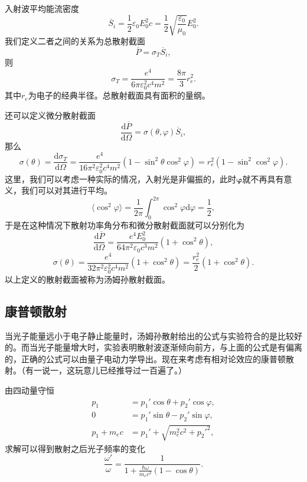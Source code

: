 \documentclass[UTF8]{ctexbook}
\renewcommand{\d}{\mathrm{d}}
\renewcommand{\b}{\boldsymbol}
\numberwithin{equation}{chapter}
\begin{document}
	入射波平均能流密度
	\[\overline{S}_i=\frac{1}{2}\varepsilon_0 E_0^2 c=\frac{1}{2}\sqrt{\frac{\varepsilon_0}{\mu_0}}E_0^2.\]
	我们定义二者之间的关系为总散射截面
	\[\overline{P}=\sigma_T\overline{S}_i,\]
	则
	\[\sigma_T=\frac{e^4}{6\pi\varepsilon_0^2 c^4 m^2}=\frac{8\pi}{3}r_e^2.\]
	其中$r_e$为电子的经典半径。总散射截面具有面积的量纲。
	
	还可以定义微分散射截面
	\[\frac{\d \overline{P}}{\d \Omega}=\sigma(\theta,\varphi)\overline{S}_i,\]
	那么
	\[\sigma(\theta)=\frac{\d \sigma_T}{\d\Omega}=\frac{e^4}{16\pi^2\varepsilon_0^2c^4m^2}(1-\sin^2\theta\cos^2\varphi)=r_e^2(1-\sin^2\cos^2\varphi).\]
	这里，我们可以考虑一种实际的情况，入射光是非偏振的，此时$\b{\varphi}$就不再具有意义，我们可以对其进行平均。
	\[\langle \cos^2\varphi\rangle =\frac{1}{2\pi}\int_0^{2\pi}\cos^2\varphi\d \varphi = \frac{1}{2},\]
	于是在这种情况下散射功率角分布和微分散射截面就可以分别化为
	\[\frac{\d \overline{P}}{\d \Omega}=\frac{e^4E_0^2}{64\pi^2\varepsilon_0c^3m^2}(1+\cos^2\theta),\]
	\[\sigma(\theta)=\frac{e^4}{32\pi^2\varepsilon_0^2c^4m^2}(1+\cos^2\theta)=\frac{r_e^2}{2}(1+\cos^2\theta).\]
	以上定义的散射截面被称为汤姆孙散射截面。
	
	\subsection{康普顿散射}
	
	当光子能量远小于电子静止能量时，汤姆孙散射给出的公式与实验符合的是比较好的。而当光子能量增大时，实验表明散射波逐渐倾向前方，与上面的公式是有偏离的，正确的公式可以由量子电动力学导出。现在来考虑有相对论效应的康普顿散射。（有一说一，这玩意儿已经推导过一百遍了。）
	\begin{figure}[H]
		\centering
	\end{figure}
	由四动量守恒
	\begin{align*}
		p_1&=p_1'\cos\theta+p_2'\cos\varphi,\\
		0&=p_1'\sin\theta-p_2'\sin\varphi,\\
		p_1+m_ec&=p_1'+\sqrt{m_e^2c^2+p_2'^2},
	\end{align*}
	求解可以得到散射之后光子频率的变化
	\[\frac{\omega'}{\omega}=\frac{1}{1+\frac{\hbar\omega}{m_ec^2}(1-\cos\theta)}.\]
	
\end{document}
